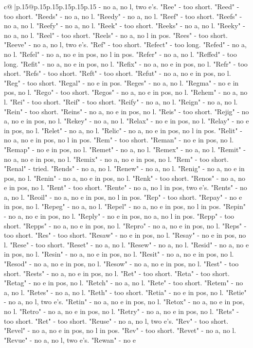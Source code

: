 \documentclass{article}
\begin{document}
{\begin{supertabular}{c@{$\;$}|p{.15\linewidth}@{}p{.15\linewidth}p{.15\linewidth}p{.15\linewidth}p{.15\linewidth}p{.15\linewidth}}
{{{{-} no a, no l, two e's. "Ree" {-} too short. "Reed" {-} too short. "Reeds" {-} no a, no l. "Reedy" {-} no a, no l. "Reef" {-} too short. "Reefs" {-} no a, no l. "Reefy" {-} no a, no l. "Reek" {-} too short. "Reeks" {-} no a, no l. "Reeky" {-} no a, no l. "Reel" {-} too short. "Reels" {-} no a, no l in pos. "Rees" {-} too short. "Reeve" {-} no a, no l, two e's. "Ref" {-} too short. "Refect" {-} too long. "Refed" {-} no a, no l. "Refel" {-} no a, no e in pos, no l in pos. "Refer" {-} no a, no l. "Reffed" {-} too long. "Refit" {-} no a, no e in pos, no l. "Refix" {-} no a, no e in pos, no l. "Refr" {-} too short. "Refs" {-} too short. "Reft" {-} too short. "Refut" {-} no a, no e in pos, no l. "Reg" {-} too short. "Regal" {-} no e in pos. "Reges" {-} no a, no l. "Regma" {-} no e in pos, no l. "Rego" {-} too short. "Regos" {-} no a, no e in pos, no l. "Rehem" {-} no a, no l. "Rei" {-} too short. "Reif" {-} too short. "Reify" {-} no a, no l. "Reign" {-} no a, no l. "Rein" {-} too short. "Reins" {-} no a, no e in pos, no l. "Reis" {-} too short. "Rejig" {-} no a, no e in pos, no l. "Rekey" {-} no a, no l. "Relax" {-} no e in pos, no l. "Relay" {-} no e in pos, no l. "Relet" {-} no a, no l. "Relic" {-} no a, no e in pos, no l in pos. "Relit" {-} no a, no e in pos, no l in pos. "Rem" {-} too short. "Reman" {-} no e in pos, no l. "Remap" {-} no e in pos, no l. "Remet" {-} no a, no l. "Remex" {-} no a, no l. "Remit" {-} no a, no e in pos, no l. "Remix" {-} no a, no e in pos, no l. "Rem" {-} too short. "Renal" {-} tried. "Rends" {-} no a, no l. "Renew" {-} no a, no l. "Renig" {-} no a, no e in pos, no l. "Renin" {-} no a, no e in pos, no l. "Renk" {-} too short. "Renos" {-} no a, no e in pos, no l. "Rent" {-} too short. "Rente" {-} no a, no l in pos, two e's. "Rents" {-} no a, no l. "Reoil" {-} no a, no e in pos, no l in pos. "Rep" {-} too short. "Repay" {-} no e in pos, no l. "Repeg" {-} no a, no l. "Repel" {-} no a, no e in pos, no l in pos. "Repin" {-} no a, no e in pos, no l. "Reply" {-} no e in pos, no a, no l in pos. "Repp" {-} too short. "Repps" {-} no a, no e in pos, no l. "Repro" {-} no a, no e in pos, no l. "Reps" {-} too short. "Res" {-} too short. "Resaw" {-} no e in pos, no l. "Resay" {-} no e in pos, no l. "Rese" {-} too short. "Reset" {-} no a, no l. "Resew" {-} no a, no l. "Resid" {-} no a, no e in pos, no l. "Resin" {-} no a, no e in pos, no l. "Resit" {-} no a, no e in pos, no l. "Resod" {-} no a, no e in pos, no l. "Resow" {-} no a, no e in pos, no l. "Rest" {-} too short. "Rests" {-} no a, no e in pos, no l. "Ret" {-} too short. "Reta" {-} too short. "Retag" {-} no e in pos, no l. "Retch" {-} no a, no l. "Rete" {-} too short. "Retem" {-} no a, no l. "Retes" {-} no a, no l. "Reth" {-} too short. "Retia" {-} no e in pos, no l. "Retie" {-} no a, no l, two e's. "Retin" {-} no a, no e in pos, no l. "Retox" {-} no a, no e in pos, no l. "Retro" {-} no a, no e in pos, no l. "Retry" {-} no a, no e in pos, no l. "Rets" {-} too short. "Ret" {-} too short. "Reuse" {-} no a, no l, two e's. "Rev" {-} too short. "Revel" {-} no a, no e in pos, no l in pos. "Rev" {-} too short. "Revet" {-} no a, no l. "Revue" {-} no a, no l, two e's. "Rewan" {-} no e }}}
\end{supertabular}}
\end{document}

